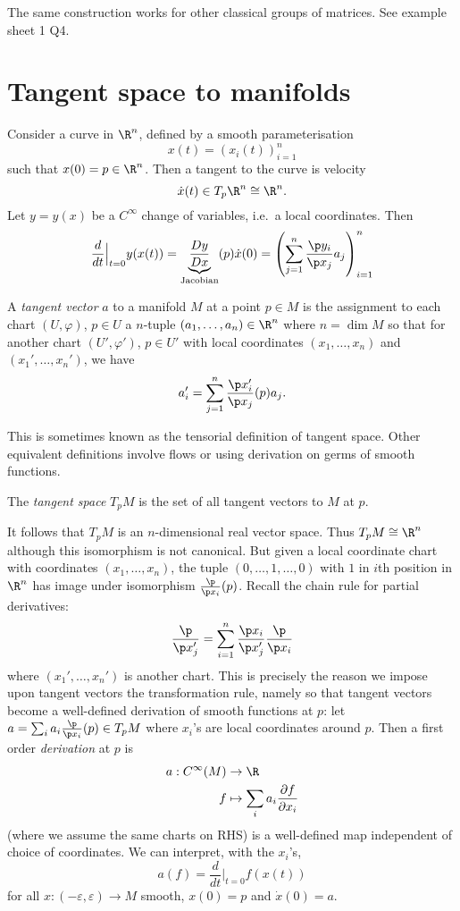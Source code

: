 \documentclass[a4paper]{article}
\begin{document}
The same construction works for other classical groups of matrices. See example sheet 1 Q4.

\section{Tangent space to manifolds}

Consider a curve in \(\R^n\), defined by a smooth parameterisation
\[
  x(t) = (x_i(t))_{i = 1}^n
\]
such that \(x(0) = p \in \R^n\). Then a tangent to the curve is velocity
\[
  \dot x(t) \in T_p\R^n \cong \R^n.
\]
Let \(y = y(x)\) be a \(C^\infty\) change of variables, i.e.\ a local coordinates. Then
\[
  \frac{d}{dt} \Big|_{t = 0} y(x(t)) = \underbrace{\frac{D y}{D x}}_{\text{Jacobian}}(p) \dot x(0)
  = \left( \sum_{j = 1}^n \frac{\p y_i}{\p x_j} a_j \right)_{i = 1}^n
\]

\begin{definition}
  A \emph{tangent vector} \(a\) to a manifold \(M\) at a point \(p \in M\) is the assignment to each chart \((U, \varphi)\), \(p \in U\) a \(n\)-tuple \((a_1, \dots, a_n) \in \R^n\) where \(n = \dim M\) so that for another chart \((U', \varphi')\), \(p \in U'\) with local coordinates \((x_1, \dots, x_n)\) and \((x_1', \dots, x_n')\), we have
  \[
    a_i' = \sum_{j = 1}^n \frac{\p x_i'}{\p x_j} (p) a_j.
  \]
\end{definition}

This is sometimes known as the tensorial definition of tangent space. Other equivalent definitions involve flows or using derivation on germs of smooth functions.

\begin{definition}
  The \emph{tangent space} \(T_pM\) is the set of all tangent vectors to \(M\) at \(p\).
\end{definition}

It follows that \(T_pM\) is an \(n\)-dimensional real vector space. Thus \(T_pM \cong \R^n\) although this isomorphism is not canonical. But given a local coordinate chart with coordinates \((x_1, \dots, x_n)\), the tuple \((0, \dots, 1, \dots, 0)\) with \(1\) in \(i\)th position in \(\R^n\) has image under isomorphism \(\frac{\p}{\p x_i} (p)\). Recall the chain rule for partial derivatives:
\[
  \frac{\p}{\p x_j'} = \sum_{i = 1}^n \frac{\p x_i}{\p x_j'} \frac{\p}{\p x_i}
\]
where \((x_1', \dots, x_n')\) is another chart. This is precisely the reason we impose upon tangent vectors the transformation rule, namely so that tangent vectors become a well-defined derivation of smooth functions at \(p\): let \(a = \sum_i a_i \frac{\p}{\p x_i} (p) \in T_pM\) where \(x_i\)'s are local coordinates around \(p\). Then a first order \emph{derivation} at \(p\) is
\begin{align*}
  a: C^\infty(M) &\to \R \\
  f &\mapsto \sum_i a_i \frac{\partial f}{\partial x_i} 
\end{align*}
(where we assume the same charts on RHS) is a well-defined map independent of choice of coordinates. We can interpret, with the \(x_i\)'s,
\[
  a(f) = \frac{d}{dt} \Big|_{t = 0} f(x(t))
\]
for all \(x: (-\varepsilon, \varepsilon) \to M\) smooth, \(x(0) = p\) and \(\dot x(0) = a\).
\end{document}
